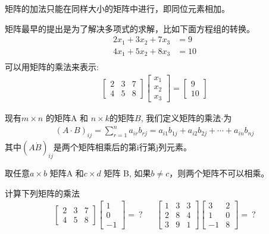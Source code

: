 \documentclass[12pt]{article}
\numberwithin{figure}{section}
\numberwithin{equation}{section}
\begin{document}
\begin{remark}
矩阵的加法只能在同样大小的矩阵中进行，即同位元素相加。	
\end{remark}

矩阵最早的提出是为了解决多项式的求解，比如下面方程组的转换。
\begin{align*}
	2x_1 + 3x_2 + 7x_3 & = 9 \\
	4x_1 + 5x_2 + 8 x_3 & = 10 \\
\end{align*}
可以用矩阵的乘法来表示:
\begin{align*}
	\begin{bmatrix}
		2 & 3 & 7 \\
		4 & 5 & 8 
	\end{bmatrix} \begin{bmatrix}
		x_1 \\
		x_2 \\
		x_3 
	\end{bmatrix} = \begin{bmatrix}
		 9 \\
		 10 
	\end{bmatrix}
\end{align*}

\begin{definition}
	现有$m \times n$ 的矩阵A 和 $n \times k$的矩阵$B$, 我们定义矩阵的乘法$\cdot$为
	\begin{align*}
		(A \cdot B)_{ij} = \sum_{r=1}^n a_{ir}b_{rj} = a_{i1}b_{1j} + a_{i2}b_{2j} + \cdots + a_{in}b_{nj}
	\end{align*}
	其中$(A \dot B)_{ij}$是两个矩阵相乘后的第i行第j列元素。
\end{definition}

\begin{remark}
取任意$a \times b$ 矩阵A 和$c \times d$ 矩阵 B, 如果$b \neq c$，则两个矩阵不可以相乘。	
\end{remark}

\begin{example}
计算下列矩阵的乘法
\begin{align*}
	\begin{bmatrix}
		2 & 3 & 7 \\
		4 & 5 & 8 
	\end{bmatrix} \begin{bmatrix}
		1 \\
		0 \\
		-1 
	\end{bmatrix} = \ ? & & \begin{bmatrix}
		1 & 3 & 3 \\
		2 & 8 & 4 \\
		3 & 9 & 1 
	\end{bmatrix} \begin{bmatrix}
		3 & 2 \\
		1 & 0 \\
		-1 & 8 
	\end{bmatrix} = \ ?
\end{align*}	
\end{example}
\end{document}
